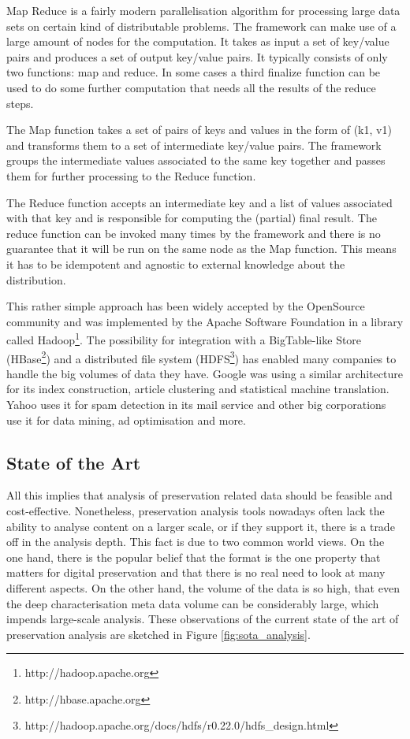 Map Reduce is a fairly modern parallelisation algorithm for processing large data sets on certain kind of distributable problems. The framework can make use of a large amount of nodes for the computation. It takes as input a set of key/value pairs and produces a set of output key/value pairs. It typically consists of only two functions: map and reduce. In some cases a third finalize function can be used to do some further computation that needs all the results of the reduce steps.

The Map function takes a set of pairs of keys and values in the form of (k1, v1) and transforms them to a set of intermediate key/value pairs. The framework groups the intermediate values associated to the same key together and passes them for further processing to the Reduce function.

The Reduce function accepts an intermediate key and a list of values associated with that key and is responsible for computing the (partial) final result. The reduce function can be invoked many times by the framework and there is no guarantee that it will be run on the same node as the Map function. This means it has to be idempotent and agnostic to external knowledge about the distribution.

This rather simple approach has been widely accepted by the OpenSource community and was implemented by the Apache Software Foundation in a library called Hadoop\footnote{http://hadoop.apache.org}. The possibility for integration with a BigTable-like Store \cite{Chang:2008:BDS:1365815.1365816} (HBase\footnote{http://hbase.apache.org}) and a distributed file system (HDFS\footnote{http://hadoop.apache.org/docs/hdfs/r0.22.0/hdfs\_design.html}) has enabled many companies to handle the big volumes of data they have. Google was using a similar architecture for its index construction, article clustering and statistical machine translation. Yahoo uses it for spam detection in its mail service and other big corporations use it for data mining, ad optimisation and more.

\subsection{State of the Art}
All this implies that analysis of preservation related data should be feasible and cost-effective. Nonetheless, preservation analysis tools nowadays often lack the ability to analyse content on a larger scale, or if they support it, there is a trade off in the analysis depth. This fact is due to two common world views. On the one hand, there is the popular belief that the format is the one property that matters for digital preservation \cite{citeulike:8904907} and that there is no real need to look at many different aspects. On the other hand, the volume of the data is so high, that even the deep characterisation meta data volume can be considerably large, which impends large-scale analysis. These observations of the current state of the art of preservation analysis are sketched in Figure \ref{fig:sota_analysis}.

